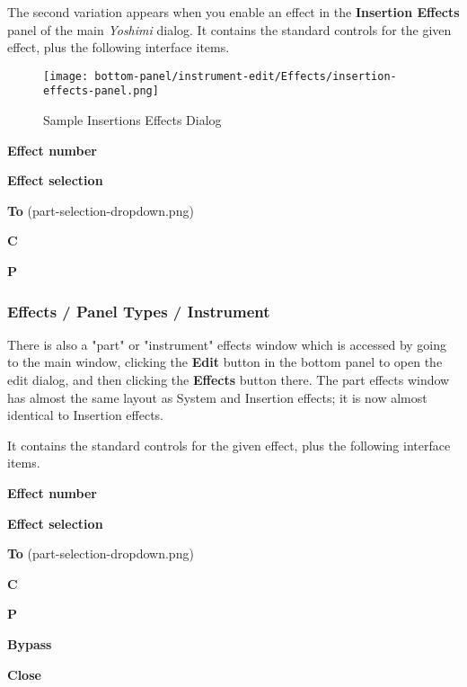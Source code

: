    The second variation
   appears when you enable an effect in the
   \textbf{Insertion Effects}
   panel of the main \textsl{Yoshimi} dialog.
   It contains the standard
   controls for the given effect, plus the following interface items.

\begin{figure}[H]
   \centering 
   \texttt{[image: bottom-panel/instrument-edit/Effects/insertion-effects-panel.png]}
   \caption{Sample Insertions Effects Dialog}
   \label{fig:sample_insertion_effects_dialog}
\end{figure}

   \begin{enumber}
      \item \textbf{Effect number}
      \item \textbf{Effect selection}
      \item \textbf{To} (part-selection-dropdown.png)
      \item \textbf{C}
      \item \textbf{P}
   \end{enumber}

\subsubsection{Effects / Panel Types / Instrument }
\label{subsubsec:effects_paneltypes_instrument}

   There is also a "part" or "instrument" effects window which is accessed
   by going to the main window, clicking the \textbf{Edit} button in the
   bottom panel to open the edit dialog, and then clicking the
   \textbf{Effects} button there.  The part effects window has almost the
   same layout as System and Insertion effects; it is now almost identical
   to Insertion effects.

   It contains the standard controls for the given effect, plus the
   following interface items.

   \begin{enumber}
      \item \textbf{Effect number}
      \item \textbf{Effect selection}
      \item \textbf{To} (part-selection-dropdown.png)
      \item \textbf{C}
      \item \textbf{P}
      \item \textbf{Bypass}
      \item \textbf{Close}
   \end{enumber}

